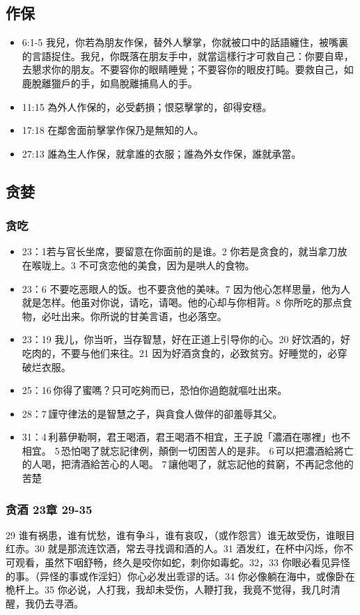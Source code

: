 \subsection{作保}
\begin{itemize}
\itemsep-.45em 
\item 6:1-5 我兒，你若為朋友作保，替外人擊掌，你就被口中的話語纏住，被嘴裏的言語捉住。我兒，你既落在朋友手中，就當這樣行才可救自己：你要自卑，去懇求你的朋友。不要容你的眼睛睡覺；不要容你的眼皮打盹。要救自己，如鹿脫離獵戶的手，如鳥脫離捕鳥人的手。
\item 11:15 為外人作保的，必受虧損；恨惡擊掌的，卻得安穩。
\item 17:18 在鄰舍面前擊掌作保乃是無知的人。
\item 27:13 誰為生人作保，就拿誰的衣服；誰為外女作保，誰就承當。 
\end{itemize}


\subsection{贪婪} 
\subsubsection{贪吃}
\begin{itemize}
\itemsep-.45em 
\item 23：1若与官长坐席，要留意在你面前的是谁。2 你若是贪食的，就当拿刀放在喉咙上。3 不可贪恋他的美食，因为是哄人的食物。
\item 23：6 不要吃恶眼人的饭。也不要贪他的美味。7 因为他心怎样思量，他为人就是怎样。他虽对你说，请吃，请喝。他的心却与你相背。8 你所吃的那点食物，必吐出来。你所说的甘美言语，也必落空。
\item 23：19 我儿，你当听，当存智慧，好在正道上引导你的心。20 好饮酒的，好吃肉的，不要与他们来往。21 因为好酒贪食的，必致贫穷。好睡觉的，必穿破烂衣服。
\item 25：16 你得了蜜嗎？只可吃夠而已，恐怕你過飽就嘔吐出來。
\item 28：7 謹守律法的是智慧之子，與貪食人做伴的卻羞辱其父。
\item 31：4 利慕伊勒啊，君王喝酒，君王喝酒不相宜，王子說「濃酒在哪裡」也不相宜。 5 恐怕喝了就忘記律例，顛倒一切困苦人的是非。 6 可以把濃酒給將亡的人喝，把清酒給苦心的人喝。 7 讓他喝了，就忘記他的貧窮，不再記念他的苦楚
\end{itemize}

\subsubsection{贪酒 23章 29-35}
29 谁有祸患，谁有忧愁，谁有争斗，谁有哀叹，（或作怨言）谁无故受伤，谁眼目红赤。30 就是那流连饮酒，常去寻找调和酒的人。31 酒发红，在杯中闪烁，你不可观看，虽然下咽舒畅，终久是咬你如蛇，刺你如毒蛇。32，33 你眼必看见异怪的事。（异怪的事或作淫妇）你心必发出乖谬的话。34 你必像躺在海中，或像卧在桅杆上。35 你必说，人打我，我却未受伤，人鞭打我，我竟不觉得，我几时清醒，我仍去寻酒。
